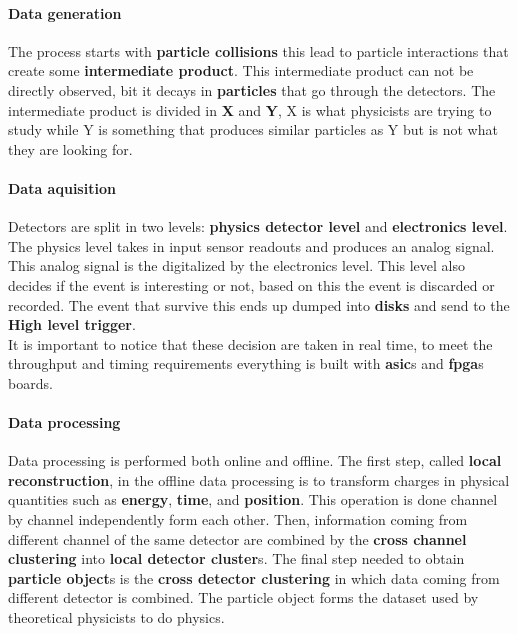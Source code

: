 \paragraph{Data generation}
The process starts with \textbf{particle collisions} this lead to particle interactions that create some \textbf{intermediate product}. This intermediate product can not be directly observed, bit it decays in \textbf{particles} that go through the detectors. The intermediate product is divided in \textbf{X} and \textbf{Y}, X is what physicists are trying to study while Y is something that produces similar particles as Y but is not what they are looking for.
\paragraph{Data aquisition}
Detectors are split in two levels: \textbf{physics detector level} and \textbf{electronics level}. The physics level takes in input sensor readouts and produces an analog signal. This analog signal is the digitalized by the electronics level. This level also decides if the event is interesting or not, based on this the event is discarded or recorded. 
The event that survive this ends up dumped into \textbf{disks} and send to the \textbf{High level trigger}. \\
It is important to notice that these decision are taken in real time, to meet the throughput and timing requirements everything is built with \textbf{asic}s and \textbf{fpga}s boards. 
\paragraph{Data processing} 
Data processing is performed both online and offline. %
The first step, called \textbf{local reconstruction}, in the offline data processing is to transform charges in physical quantities such as \textbf{energy}, \textbf{time}, and \textbf{position}. This operation is done channel by channel independently form each other. Then, information coming from different channel of the same detector are combined by the \textbf{cross channel clustering} into \textbf{local detector cluster}s. The final step needed to obtain \textbf{particle object}s is the \textbf{cross detector clustering} in which data coming from different detector is combined. The particle object forms the dataset used by theoretical physicists to do physics. \\

